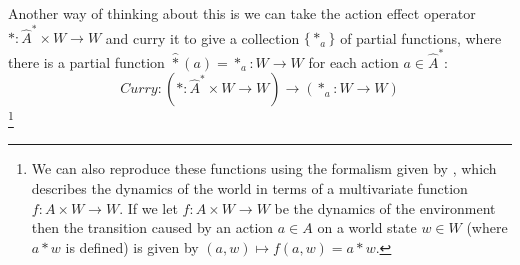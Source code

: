 Another way of thinking about this is we can take the action effect operator $* : \hat{A}^{*} \times W \to W$ and curry it to give a collection $\{*_{a}\}$ of partial functions, where there is a partial function $\hat{*}(a)=*_{a}: W \to W$ for each action $a \in \hat{A}^{*}$:
\begin{equation*}
    \textit{Curry}: (*: \hat{A}^{*} \times W \to W) \to (*_{a}: W \to W)
\end{equation*}
\footnote{
We can also reproduce these functions using the formalism given by \autocite{caselles2019symmetry}, which describes the dynamics of the world in terms of a multivariate function $f: A \times W \to W$.
If we let $f: A \times W \to W$ be the dynamics of the environment then the transition caused by an action $a \in A$ on a world state $w \in W$ (where $a * w$ is defined) is given by $(a,w) \mapsto f(a,w) = a * w$. 
}

